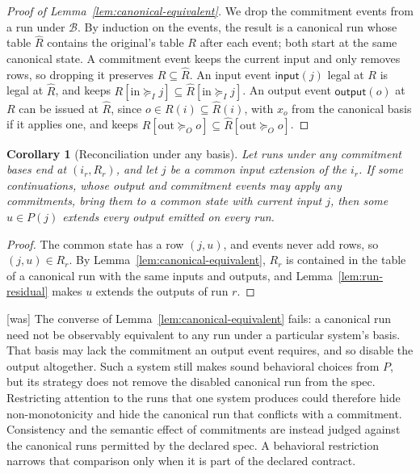\documentclass[sigconf]{cidr-2027}
\newtheorem{corollary}{Corollary}
\theoremstyle{remark}
\newcommand{\InputGe}{\succeq_I}
\newcommand{\OutputGe}{\succeq_O}
\newcommand{\commitment}{commitment\xspace}
\newcommand{\commitments}{commitments\xspace}
\newcommand{\indesc}{input extension\xspace} %
\newcommand{\outrel}{extends\xspace}          %
\newcommand{\fiber}[1]{P(#1)}
\begin{document}
\color{blue!70!black}\begin{proof}[Proof of Lemma~\ref{lem:canonical-equivalent}]
We drop the \commitment events from a run under $\mathcal B$.  By induction on
the events, the result is a canonical run whose table $\widehat R$ contains
the original's table $R$ after each event; both start at the same canonical
state.  A \commitment event keeps the current input and only removes rows, so
dropping it preserves $R\subseteq\widehat R$.  An input event
$\mathsf{input}(j)$ legal at $R$ is legal at $\widehat R$, and keeps
$R[\mathrm{in}\InputGe j]\subseteq\widehat R[\mathrm{in}\InputGe j]$.  An
output event $\mathsf{output}(o)$ at $R$ can be issued at $\widehat R$, since
$o\in R(i)\subseteq\widehat R(i)$, with $x_o$ from the canonical basis if it
applies one, and keeps
$R[\mathrm{out}\OutputGe o]\subseteq\widehat R[\mathrm{out}\OutputGe o]$.\color{black}
\end{proof}

\begin{corollary}[Reconciliation under any basis]
\label{cor:reconciliation-any-basis}
Let runs under any \commitment bases end at $(i_r,R_r)$, and let $j$ be a
common \indesc of the $i_r$.  If some continuations, whose output and \commitment events
may apply any \commitments, bring them to a common state with current input $j$,
then some $u\in\fiber{j}$ \outrel every output emitted on every run.
\end{corollary}

\begin{proof}
The common state has a row $(j,u)$, and events never add rows, so
$(j,u)\in R_r$.  By Lemma~\ref{lem:canonical-equivalent}, $R_r$ is contained in
the table of a canonical run with the same inputs and outputs, and
Lemma~\ref{lem:run-residual} makes $u$ \outrel the outputs of run $r$.
\end{proof}



{\footnotesize\color{black!50}\noindent\textsf{[was]} The converse of Lemma~\ref{lem:canonical-equivalent} fails: a canonical run
need not be observably equivalent to any run under a particular system's
basis.  That basis may lack the \commitment an
output event requires, and so disable the output altogether.  Such a system
still makes sound behavioral choices from $P$, but its strategy does not remove
the disabled canonical run from the spec.  Restricting attention to the runs
that one system produces could therefore hide non-monotonicity and hide the
canonical run that conflicts with a \commitment.  Consistency and the semantic
effect of \commitments are instead judged against the canonical runs permitted
by the declared spec.  A behavioral restriction narrows that comparison only
when it is part of the declared contract.\par}
\end{document}
